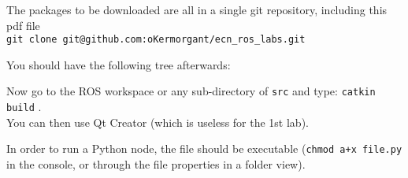\documentclass{ecnreport}
\newcommand{\ttt}[1]
{
{\tt{#1}}
}
\begin{document}
The packages to be downloaded are all in a single git repository, including this pdf file\\ \ttt{git clone git@github.com:oKermorgant/ecn\_ros\_labs.git}
You should have the following tree afterwards:
\begin{center}\begin{minipage}{.4\linewidth}
  \end{minipage}
\end{center}

Now go to the ROS workspace or any sub-directory of \ttt{src} and type: \ttt{catkin build}.\\ You can then use Qt Creator (which is useless for the 1st lab).

In order to run a Python node, the file should be executable (\texttt{chmod a+x file.py} in the console, or through the file properties in a folder view).

% 
% 
% 
% 
% 
% 
% 
% 
\end{document}
